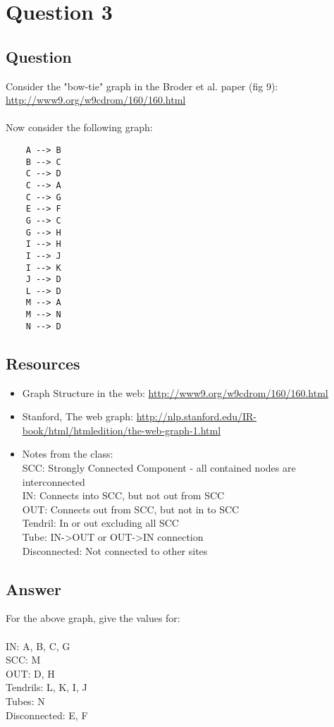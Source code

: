 \section{Question 3}

\subsection{Question}
Consider the "bow-tie" graph in the Broder et al. paper (fig 9): 
\url{http://www9.org/w9cdrom/160/160.html}\\\\
Now consider the following graph:
\begin{verbatim}
    A --> B
    B --> C
    C --> D
    C --> A
    C --> G
    E --> F
    G --> C
    G --> H
    I --> H
    I --> J
    I --> K
    J --> D 
    L --> D
    M --> A
    M --> N
    N --> D
\end{verbatim}

\subsection{Resources}
\begin{itemize}
\item Graph Structure in the web: \url{http://www9.org/w9cdrom/160/160.html}
\item Stanford, The web graph: \url{http://nlp.stanford.edu/IR-book/html/htmledition/the-web-graph-1.html}
\item Notes from the class:\\
SCC: Strongly Connected Component - all contained nodes are interconnected\\
IN: Connects into SCC, but not out from SCC\\
OUT: Connects out from SCC, but not in to SCC\\
Tendril: In or out excluding all SCC\\
Tube: IN->OUT or OUT->IN connection\\
Disconnected: Not connected to other sites\\
\end{itemize}

\subsection{Answer}
For the above graph, give the values for:\\\\
    IN: A, B, C, G\\
    SCC: M\\
    OUT: D, H\\
    Tendrils: L, K, I, J\\
    Tubes: N\\
    Disconnected: E, F\\